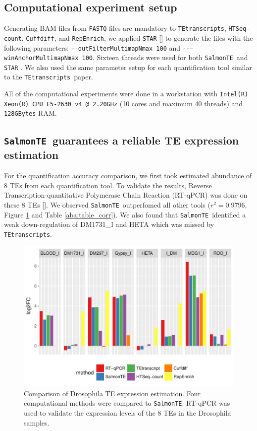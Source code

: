 \documentclass[wsdraft]{ws-procs11x85}
\newcommand{\TEtranscripts}{\texttt{TEtranscripts}}
\newcommand{\SalmonTE}{\texttt{SalmonTE}}
\newcommand{\HTSeq}{\texttt{HTSeq-count}}
\newcommand{\Cuffdiff}{\texttt{Cuffdiff}}
\newcommand{\RepEnrich}{\texttt{RepEnrich}}
\begin{document}
\subsection{Computational experiment setup}

Generating BAM files from \verb|FASTQ| files are mandatory to  \TEtranscripts, \HTSeq, \Cuffdiff, and \RepEnrich, we applied \verb|STAR| [] to generate the files with the following parameters: \verb|--outFilterMultimapNmax 100| and \verb|--–winAnchorMultimapNmax 100|. Sixteen threads were used for  both \SalmonTE~and \verb|STAR| . We also used the same parameter setup for each quantification tool similar to the \TEtranscripts~paper.

All of the computational experiments were done in a workstation with \texttt{Intel(R) Xeon(R) CPU E5-2630 v4 @ 2.20GHz} (10 cores and maximum 40 threads) and \texttt{128GBytes} RAM. 

\subsection{\SalmonTE~guarantees a reliable TE expression estimation}

For the quantification accuracy comparison, we first took estimated abundance of 8 TEs from each quantification tool. To validate the results, Reverse Transcription-quantitative Polymerase Chain Reaction (RT-qPCR) was done on these 8 TEs [].
We observed \SalmonTE~outperfomed all other tools ($r^2=0.9796$, Figure \ref{aba:fig4} and Table \ref{aba:table_corr}). We also found that \SalmonTE~identified a weak down-regulation of DM1731\_I and HETA which was missed by \TEtranscripts.

\begin{figure}[h]
\centerline{
\includegraphics[width=14cm]{fig_bar}
}
\caption{Comparison of Drosophila TE expression estimation. Four computational methods were compared to \SalmonTE.  
RT-qPCR was used to validate the expression levels of the 8 TEs in the
Drosophila samples.}
\label{aba:fig4}
\end{figure}
\end{document}
